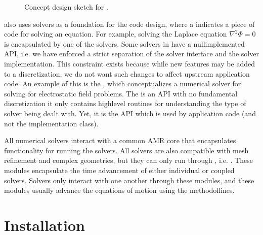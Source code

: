 \documentclass[letterpaper,10pt,english]{sphinxmanual}
\let\sphinxpxdimen\pdfpxdimen\else\newdimen\sphinxpxdimen
\begin{document}
\begin{figure}[htb]
\centering
\capstart

\noindent\sphinxincludegraphics[width=600\sphinxpxdimen]{{Design}.png}
\caption{Concept design sketch for .}\label{\detokenize{Base/Overview:id2}}\label{\detokenize{Base/Overview:fig-design}}\end{figure}

 also uses  solvers as a foundation for the code design, where a  indicates a piece of code for solving an equation.
For example, solving the Laplace equation \(\nabla^2\Phi = 0\) is encapsulated by one of the  solvers.
Some solvers in  have a null\sphinxhyphen{}implemented API, i.e. we have enforced a strict separation of the solver interface and the solver implementation.
This constraint exists because while new features may be added to a discretization, we do not want such changes to affect upstream application code.
An example of this is the , which conceptualizes a numerical solver for solving for electrostatic field problems.
The  is an API with no fundamental discretization \textendash{} it only contains high\sphinxhyphen{}level routines for understanding the type of solver being dealt with.
Yet, it is the  API which is used by application code (and not the implementation class).

All numerical solvers interact with a common AMR core that encapsulates functionality for running the solvers.
All solvers are also compatible with mesh refinement and complex geometries, but they can only run through , i.e. .
These modules encapsulate the time advancement of either individual or coupled solvers.
Solvers only interact with one another through these modules, and these modules usually advance the equations of motion using the method\sphinxhyphen{}of\sphinxhyphen{}lines.


\section{Installation}
\label{\detokenize{Base/Installation:installation}}\label{\detokenize{Base/Installation:chap-installation}}\label{\detokenize{Base/Installation::doc}}
\end{document}
